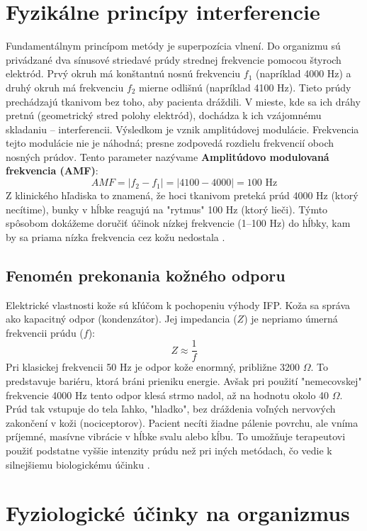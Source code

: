 \section{Fyzikálne princípy interferencie}

Fundamentálnym princípom metódy je superpozícia vlnení. Do organizmu sú privádzané dva sínusové striedavé prúdy strednej frekvencie pomocou štyroch elektród. Prvý okruh má konštantnú nosnú frekvenciu $f_1$ (napríklad 4000 Hz) a druhý okruh má frekvenciu $f_2$ mierne odlišnú (napríklad 4100 Hz).
Tieto prúdy prechádzajú tkanivom bez toho, aby pacienta dráždili. V mieste, kde sa ich dráhy pretnú (geometrický stred polohy elektród), dochádza k ich vzájomnému skladaniu – interferencii. Výsledkom je vznik amplitúdovej modulácie. Frekvencia tejto modulácie nie je náhodná; presne zodpovedá rozdielu frekvencií oboch nosných prúdov. Tento parameter nazývame \textbf{Amplitúdovo modulovaná frekvencia (AMF)}:
\[ AMF = |f_2 - f_1| = |4100 - 4000| = 100 \text{ Hz} \]
Z klinického hľadiska to znamená, že hoci tkanivom preteká prúd 4000 Hz (ktorý necítime), bunky v hĺbke reagujú na "rytmus" 100 Hz (ktorý lieči). Týmto spôsobom dokážeme doručiť účinok nízkej frekvencie (1–100 Hz) do hĺbky, kam by sa priama nízka frekvencia cez kožu nedostala \parencite{Robertson2006, Goats1990}.

\subsection{Fenomén prekonania kožného odporu}
Elektrické vlastnosti kože sú kľúčom k pochopeniu výhody IFP. Koža sa správa ako kapacitný odpor (kondenzátor). Jej impedancia ($Z$) je nepriamo úmerná frekvencii prúdu ($f$):
\[ Z \approx \frac{1}{f} \]
Pri klasickej frekvencii 50 Hz je odpor kože enormný, približne 3200 $\Omega$. To predstavuje bariéru, ktorá bráni prieniku energie.
Avšak pri použití "nemecovskej" frekvencie 4000 Hz tento odpor klesá strmo nadol, až na hodnotu okolo 40 $\Omega$. Prúd tak vstupuje do tela ľahko, "hladko", bez dráždenia voľných nervových zakončení v koži (nociceptorov). Pacient necíti žiadne pálenie povrchu, ale vníma príjemné, masívne vibrácie v hĺbke svalu alebo kĺbu. To umožňuje terapeutovi použiť podstatne vyššie intenzity prúdu než pri iných metódach, čo vedie k silnejšiemu biologickému účinku \parencite{Navratil2019, Watson2020}.

\section{Fyziologické účinky na organizmus}

